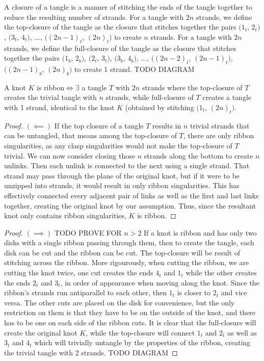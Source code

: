 \begin{paper}
A closure of a tangle is a manner of stitching the ends of the tangle together
to reduce the resulting number of strands.
For a tangle with $2n$ strands, we define the top-closure of the tangle as the
closure that stitches together the pairs $(1_t$, $2_t)$, $(3_t$, $4_t)$, ...,
$((2n-1)_t$, $(2n)_t)$ to create $n$ strands.
For a tangle with $2n$ strands, we define the full-closure of the tangle as the
closure that stitches together the pairs $(1_b$, $2_b)$, $(2_t$, $3_t)$, $(3_b$,
$4_b)$, ..., $((2n-2)_t$, $(2n-1)_t)$, $((2n-1)_b$, $(2n)_b)$ to create 1
strand.
TODO DIAGRAM
\begin{theorem}
A knot $K$ is ribbon$\iff\exists$ a tangle $T$ with $2n$ strands where the
top-closure of $T$ creates the trivial tangle with $n$ strands, while
full-closure of $T$ creates a tangle with 1 strand, identical to the knot $K$
(obtained by stitching $(1_t$, $(2n)_t)$.
\end{theorem}
\begin{proof}
$(\impliedby)$
If the top closure of a tangle $T$ results in $n$ trivial strands that can be
untangled, that means among the top-closure of $T$, there are only ribbon
singularities, as any clasp singularities would not make the top-closure of $T$
trivial.
We can now consider closing those $n$ strands along the bottom to create $n$
unlinks.
Then each unlink is connected to the next using a single strand.
That strand may pass through the plane of the original knot, but if it were to
be unzipped into strands, it would result in only ribbon singularities.
This has effectively connected every adjacent pair of links as well as the first
and last links together, creating the original knot by our assumption.
Thus, since the resultant knot only contains ribbon singularities, $K$ is
ribbon.
\end{proof}
\begin{proof}
$(\implies)$
TODO PROVE FOR $n>2$
If a knot is ribbon and has only two disks with a single ribbon passing through
them, then to create the tangle, each disk can be cut and the ribbon can be cut.
The top-closure will be result of stitching across the ribbon.
More rigourously, when cutting the ribbon, we are cutting the knot twice, one
cut creates the ends $4_t$ and $1_t$ while the other creates the ends $2_t$ and
$3_t$, in order of appearance when moving along the knot.
Since the ribbon's strands run antiparallel to each other, then $1_t$ is closer
to $2_t$ and vice versa.
The other cuts are placed on the disk for convenience, but the only restriction
on them is that they have to be on the outside of the knot, and there has to be
one on each side of the ribbon cuts.
It is clear that the full-closure will create the original knot $K$, while the
top-closure will connect $1_t$ and $2_t$ as well as $3_t$ and $4_t$ which will
trivially untangle by the properties of the ribbon, creating the trivial tangle
with 2 strands.
TODO DIAGRAM
\end{proof}
\end{paper}

